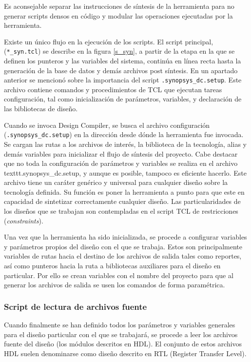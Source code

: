 Es aconsejable separar las instrucciones de síntesis de la herramienta para no generar scripts densos en código y modular las operaciones ejecutadas por la herramienta.

Existe un único flujo en la ejecución de los scripts. El script principal, (\texttt{*\_syn.tcl}) se describe en la figura \ref{s_syn}, a partir de la etapa en la que se definen los punteros y las variables del sistema, continúa en línea recta hasta la generación de la base de datos y demás archivos post síntesis. En un apartado anterior se mencionó sobre la importancia del script \texttt{.synopsys\_dc.setup}. Este archivo contiene comandos y procedimientos de TCL que ejecutan tareas configuración, tal como inicialización de parámetros, variables, y declaración de las bibliotecas de diseño.

Cuando se invoca Design Compiler, se busca el archivo configuración (\texttt{.synopsys\_dc.setup}) en la dirección desde dónde la herramienta fue invocada. Se cargan las rutas a los archivos de interés, la biblioteca de la tecnología, alias y demás variables para inicializar el flujo de síntesis del proyecto. Cabe destacar que no toda la configuración de parámetros y variables se realiza en el archivo texttt{.synopsys\_dc.setup}, y aunque es posible, tampoco es eficiente hacerlo. Este archivo tiene un caráter genérico y universal para cualquier diseño sobre la tecnología definida. Su función es poner la herramienta a punto para que este en capacidad de sintetizar correctamente cualquier diseño. Las particularidades de los diseños que se trabajan son contempladas en el script TCL de restricciones (\textit{constraints}).

Una vez que la herramienta ha sido inicializada, se procede a configurar variables y parámetros propios del diseño con el que se trabaja. Estos son principalmente variables de rutas hacia el destino de los archivos de salida tales como reportes, así como punteros hacia la ruta a bibliotecas auxiliares para el diseño en particular. Por ello se crean variables con el nombre del proyecto para que al generar los archivos de salida se usen los comandos de forma paramétrica.

\subsubsection{Script de lectura de archivos fuente}

Cuando finalmente se han definido todos los parámetros y variables generales para el diseño particular con el que se trabajará, se procede a leer los archivos fuente del diseño (los módulos descritos en HDL). El conjunto de estos archivos HDL suelen denominarse como diseño descrito en RTL (Register Transfer Level).

